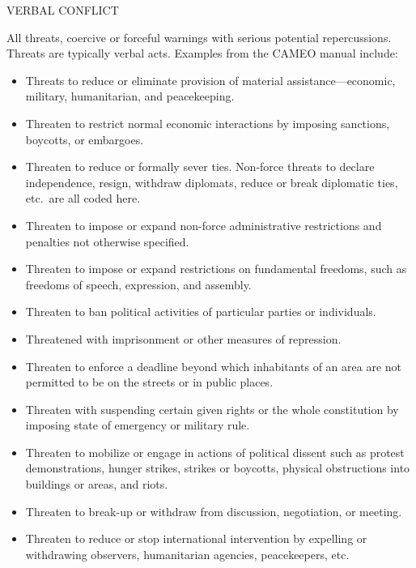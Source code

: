 \documentclass[11pt]{report}
\begin{document}
\textsf{VERBAL CONFLICT} \vspace{8pt}

All threats, coercive or forceful warnings with serious potential repercussions. Threats are typically verbal acts. Examples from the CAMEO manual include:

\begin{itemize}

\item Threats to reduce or eliminate provision of material assistance---economic, military, humanitarian, and peacekeeping.

\item Threaten to restrict normal economic interactions by imposing sanctions, boycotts, or embargoes.

\item Threaten to reduce or formally sever ties. Non-force threats to declare independence, resign, withdraw diplomats, reduce or break diplomatic ties, etc.\ are all coded here.

\item Threaten to impose or expand non-force administrative restrictions and penalties not otherwise specified.

\item Threaten to impose or expand restrictions on fundamental freedoms, such as freedoms of speech, expression, and assembly. 
\item Threaten to ban political activities of particular parties or individuals.
\item Threatened with imprisonment or other measures of repression.

\item Threaten to enforce a deadline beyond which inhabitants of an area are not permitted to be on the streets or in public places.

\item Threaten with suspending certain given rights or the whole constitution by imposing state of emergency or military rule.

\item Threaten to mobilize or engage in actions of political dissent such as protest demonstrations, hunger strikes, strikes or boycotts, physical obstructions into buildings or areas, and riots.

\item Threaten to break-up or withdraw from discussion, negotiation, or meeting.

\item Threaten to reduce or stop international intervention by expelling or withdrawing observers, humanitarian agencies, peacekeepers, etc.


\end{itemize}
\end{document}
